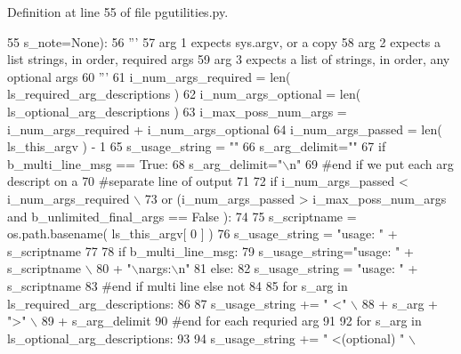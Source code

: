 Definition at line 55 of file pgutilities.\+py.


\begin{DoxyCode}
55             s\_note=\textcolor{keywordtype}{None}):
56     \textcolor{stringliteral}{'''}
57 \textcolor{stringliteral}{    arg 1 expects sys.argv, or a copy}
58 \textcolor{stringliteral}{    arg 2 expects a list strings, in order, required args}
59 \textcolor{stringliteral}{    arg 3 expects a list of strings, in order, any optional args}
60 \textcolor{stringliteral}{    '''}
61     i\_num\_args\_required = len( ls\_required\_arg\_descriptions )
62     i\_num\_args\_optional = len( ls\_optional\_arg\_descriptions )
63     i\_max\_poss\_num\_args = i\_num\_args\_required + i\_num\_args\_optional 
64     i\_num\_args\_passed = len( ls\_this\_argv ) - 1  
65     s\_usage\_string = \textcolor{stringliteral}{""}
66     s\_arg\_delimit=\textcolor{stringliteral}{""}
67     \textcolor{keywordflow}{if} b\_multi\_line\_msg == \textcolor{keyword}{True}:
68         s\_arg\_delimit=\textcolor{stringliteral}{"\(\backslash\)n"}
69     \textcolor{comment}{#end if we put each arg descript on a }
70     \textcolor{comment}{#separate line of output}
71 
72     \textcolor{keywordflow}{if} i\_num\_args\_passed <  i\_num\_args\_required  \(\backslash\)
73             \textcolor{keywordflow}{or} (i\_num\_args\_passed > i\_max\_poss\_num\_args \textcolor{keywordflow}{and} b\_unlimited\_final\_args == \textcolor{keyword}{False} ): 
74     
75         s\_scriptname = os.path.basename( ls\_this\_argv[ 0 ] )    
76         s\_usage\_string = \textcolor{stringliteral}{"usage: "} + s\_scriptname 
77 
78         \textcolor{keywordflow}{if} b\_multi\_line\_msg:
79             s\_usage\_string=\textcolor{stringliteral}{"usage: "} + s\_scriptname \(\backslash\)
80                     + \textcolor{stringliteral}{"\(\backslash\)nargs:\(\backslash\)n"}
81         \textcolor{keywordflow}{else}:
82             s\_usage\_string = \textcolor{stringliteral}{"usage: "} + s\_scriptname 
83         \textcolor{comment}{#end if multi line else not}
84 
85         \textcolor{keywordflow}{for} s\_arg \textcolor{keywordflow}{in} ls\_required\_arg\_descriptions:
86 
87             s\_usage\_string += \textcolor{stringliteral}{" <"} \(\backslash\)
88                 + s\_arg + \textcolor{stringliteral}{">"} \(\backslash\)
89                 + s\_arg\_delimit
90         \textcolor{comment}{#end for each requried arg}
91 
92         \textcolor{keywordflow}{for} s\_arg \textcolor{keywordflow}{in} ls\_optional\_arg\_descriptions:
93 
94             s\_usage\_string += \textcolor{stringliteral}{" <(optional) "} \(\backslash\)

\end{DoxyCode}

